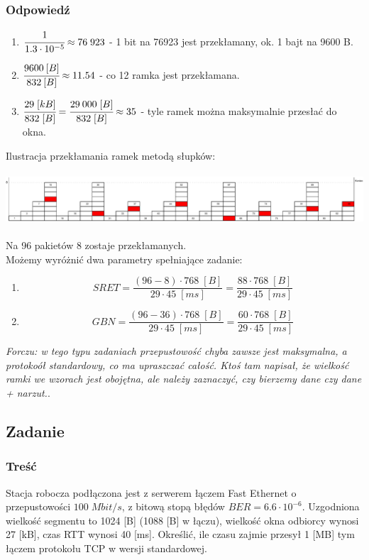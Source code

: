 		\subsubsection{Odpowiedź}
			\begin{enumerate}
				\item $ \cfrac{1}{1.3\cdot 10^{-5}}\approx 76\;923 $ - 1 bit na 76923 jest przekłamany, ok. 1 bajt na 9600 B.
				\item $ \cfrac{9600\:[B]}{832\:[B]}\approx11.54 $ - co 12 ramka jest przekłamana.
				\item $ \cfrac{29\;[kB]}{832\;[B]}=\cfrac{29\:000\;[B]}{832\;[B]}\approx 35 $ - tyle ramek można maksymalnie przesłać do okna.
			\end{enumerate}
			Ilustracja przekłamania ramek metodą słupków:\\\\
			\includegraphics[width=16.0cm]{./images/zadanie08.pdf}\\\\
			Na 96 pakietów 8 zostaje przekłamanych.\\
			Możemy wyróżnić dwa parametry spełniające zadanie:
			\begin{enumerate}
				\item $$ SRET=\frac{(96-8)\cdot 768\;[B]}{29\cdot 45\;[ms]}=\frac{88\cdot 768\;[B]}{29\cdot 45\;[ms]} $$
				\item $$ GBN=\frac{(96-36)\cdot 768\;[B]}{29\cdot 45\;[ms]}=\frac{60\cdot 768\;[B]}{29\cdot 45\;[ms]} $$
			\end{enumerate}
			\small{ \emph{Forczu: w tego typu zadaniach przepustowość chyba zawsze jest maksymalna, a protokoół standardowy, co ma upraszczać całość.
			Ktoś tam napisał, że wielkość ramki we wzorach jest obojętna, ale należy zaznaczyć, czy bierzemy dane czy dane + narzut.}}.
\newpage
	\subsection{Zadanie}
		\subsubsection{Treść}
			Stacja robocza podłączona jest z serwerem łączem Fast Ethernet o przepustowości $100\;Mbit/s $, z bitową stopą błędów $ BER=6.6\cdot 10^{-6} $. Uzgodniona wielkość segmentu to 1024 [B] (1088 [B] w łączu), wielkość okna odbiorcy wynosi 27 [kB], czas RTT wynosi 40 [ms]. Określić, ile czasu zajmie przesył 1 [MB] tym łączem protokołu TCP w wersji standardowej.
